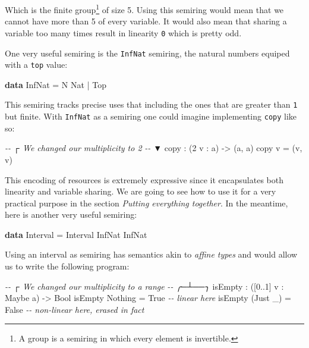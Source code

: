 \documentclass[
]{article}
\newenvironment{Shaded}{}{}
\newcommand{\CommentTok}[1]{\textcolor[rgb]{0.38,0.63,0.69}{\textit{#1}}}
\newcommand{\DataTypeTok}[1]{\textcolor[rgb]{0.56,0.13,0.00}{#1}}
\newcommand{\DecValTok}[1]{\textcolor[rgb]{0.25,0.63,0.44}{#1}}
\newcommand{\KeywordTok}[1]{\textcolor[rgb]{0.00,0.44,0.13}{\textbf{#1}}}
\newcommand{\NormalTok}[1]{#1}
\newcommand{\OperatorTok}[1]{\textcolor[rgb]{0.40,0.40,0.40}{#1}}
\newcommand{\OtherTok}[1]{\textcolor[rgb]{0.00,0.44,0.13}{#1}}
\begin{document}
Which is the finite group\footnote{A group is a semiring in which every
  element is invertible.} of size 5. Using this semiring would mean that
we cannot have more than 5 of every variable. It would also mean that
sharing a variable too many times result in linearity \texttt{0} which
is pretty odd.

One very useful semiring is the \texttt{InfNat} semiring, the natural
numbers equiped with a \texttt{top} value:

\begin{Shaded}
\begin{Highlighting}[]
\KeywordTok{data} \DataTypeTok{InfNat} \OtherTok{=} \DataTypeTok{N} \DataTypeTok{Nat} \OperatorTok{|} \DataTypeTok{Top}
\end{Highlighting}
\end{Shaded}

This semiring tracks precise uses that including the ones that are
greater than \texttt{1} but finite. With \texttt{InfNat} as a semiring
one could imagine implementing \texttt{copy} like so:

\begin{Shaded}
\begin{Highlighting}[]
\CommentTok{{-}{-}      ┌ We changed our multiplicity to 2}
\CommentTok{{-}{-}      ▼}
\NormalTok{copy }\OperatorTok{:}\NormalTok{ (}\DecValTok{2}\NormalTok{ v }\OperatorTok{:}\NormalTok{ a) }\OtherTok{{-}\textgreater{}}\NormalTok{ (a, a)}
\NormalTok{copy v }\OtherTok{=}\NormalTok{ (v, v)}
\end{Highlighting}
\end{Shaded}

This encoding of resources is extremely expressive since it encapsulates
both linearity and variable sharing. We are going to see how to use it
for a very practical purpose in the section \emph{Putting everything
together}. In the meantime, here is another very useful semiring:

\begin{Shaded}
\begin{Highlighting}[]
\KeywordTok{data} \DataTypeTok{Interval} \OtherTok{=} \DataTypeTok{Interval} \DataTypeTok{InfNat} \DataTypeTok{InfNat}
\end{Highlighting}
\end{Shaded}

Using an interval as semiring has semantics akin to \emph{affine types}
and would allow us to write the following program:

\begin{Shaded}
\begin{Highlighting}[]
\CommentTok{{-}{-}           ┌ We changed our multiplicity to a range}
\CommentTok{{-}{-}         ╭─┴──╮}
\NormalTok{isEmpty }\OperatorTok{:}\NormalTok{ ([}\DecValTok{0}\OperatorTok{..}\DecValTok{1}\NormalTok{] v }\OperatorTok{:} \DataTypeTok{Maybe}\NormalTok{ a) }\OtherTok{{-}\textgreater{}} \DataTypeTok{Bool}
\NormalTok{isEmpty }\DataTypeTok{Nothing} \OtherTok{=} \DataTypeTok{True} \CommentTok{{-}{-} linear here}
\NormalTok{isEmpty (}\DataTypeTok{Just}\NormalTok{ \_) }\OtherTok{=} \DataTypeTok{False} \CommentTok{{-}{-} non{-}linear here, erased in fact}
\end{Highlighting}
\end{Shaded}
\end{document}
